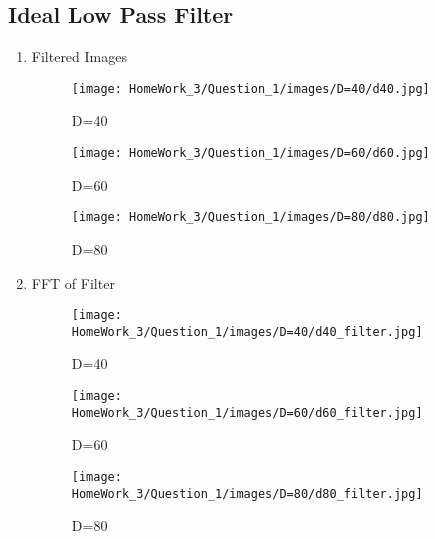 \documentclass{article}
\begin{document}
\begin{enumerate}
\subsection*{Ideal Low Pass Filter}
\begin{enumerate}
    \item Filtered Images
        \begin{figure}[!h]
            \centering
            \begin{minipage}{0.3\textwidth}
                \texttt{[image: HomeWork\_3/Question\_1/images/D=40/d40.jpg]}
                \caption{D=40}
            \end{minipage}
            \hfill
                \centering
            \begin{minipage}{0.3\textwidth}
                \texttt{[image: HomeWork\_3/Question\_1/images/D=60/d60.jpg]}
                \caption{D=60}
            \end{minipage}
            \hfill
                \centering
            \begin{minipage}{0.3\textwidth}
                \texttt{[image: HomeWork\_3/Question\_1/images/D=80/d80.jpg]}
                \caption{D=80}
            \end{minipage}
            \hfill
        \end{figure}
        \newpage
    \item FFT of Filter
        \begin{figure}[!h]
            \centering
            \begin{minipage}{0.3\textwidth}
                \texttt{[image: HomeWork\_3/Question\_1/images/D=40/d40\_filter.jpg]}
                \caption{D=40}
            \end{minipage}
            \hfill
                \centering
            \begin{minipage}{0.3\textwidth}
                \texttt{[image: HomeWork\_3/Question\_1/images/D=60/d60\_filter.jpg]}
                \caption{D=60}
            \end{minipage}
            \hfill
                \centering
            \begin{minipage}{0.3\textwidth}
                \texttt{[image: HomeWork\_3/Question\_1/images/D=80/d80\_filter.jpg]}
                \caption{D=80}
            \end{minipage}
            \hfill
        \end{figure}

\end{enumerate}
\end{enumerate}
\end{document}
